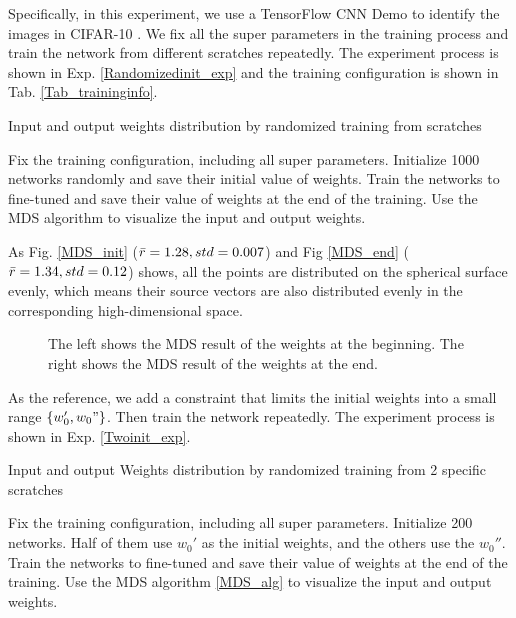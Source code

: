 \documentclass[letterpaper]{article} %
\begin{document}
Specifically, in this experiment, we use a TensorFlow CNN Demo \cite{TensorflowDemo} to identify the images in CIFAR-10 \cite{Krizhevsky09learningmultiple}. We fix all the super parameters in the training process and train the network from different scratches repeatedly. The experiment process is shown in Exp. \ref{Randomizedinit_exp} and the training configuration is shown in Tab. \ref{Tab_traininginfo}.



\begin{algorithm}
\caption{Input and output weights distribution by randomized training from scratches \label{Randomizedinit_exp}}
\begin{algorithmic}[1]
    \STATE Fix the training configuration, including all super parameters.
    \STATE Initialize 1000 networks randomly and save their initial value of weights.
    \STATE Train the networks to fine-tuned and save their value of weights at the end of the training.
    \STATE Use the MDS algorithm to visualize the input and output weights.
\end{algorithmic}
\end{algorithm}

As Fig. \ref{MDS_init} ($\Bar{r} = 1.28, std = 0.007$) and Fig \ref{MDS_end} ($\Bar{r} = 1.34, std = 0.12$) shows, all the points are distributed on the spherical surface evenly, which means their source vectors are also distributed evenly in the corresponding high-dimensional space.

\begin{figure}[htb]
    \centering
    \caption{The left shows the MDS result of the weights at the beginning. The right shows the MDS result of the weights at the end.}
    \label{MDS_fig}
\end{figure}

As the reference, we add a constraint that limits the initial weights into a small range $\{w_0', w_0" \}$. Then train the network repeatedly. The experiment process is shown in Exp. \ref{Twoinit_exp}.
\begin{algorithm}
\caption{Input and output Weights distribution by randomized training from 2 specific scratches\label{Twoinit_exp}}
\begin{algorithmic}[1]
    \STATE Fix the training configuration, including all super parameters.
    \STATE Initialize 200 networks. Half of them use $w_0'$ as the initial weights, and the others use the $w_0''$.
    \STATE Train the networks to fine-tuned and save their value of weights at the end of the training.
    \STATE Use the MDS algorithm \ref{MDS_alg} to visualize the input and output weights.
\end{algorithmic}
\end{algorithm}
\end{document}
